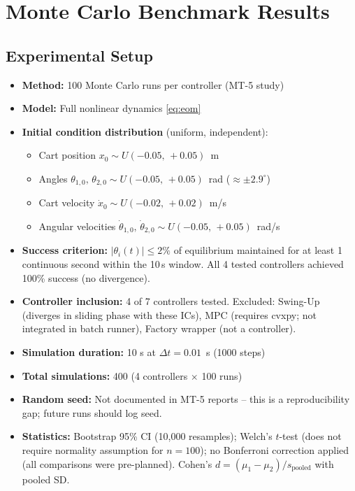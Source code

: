 \documentclass[11pt, a4paper]{article}
\begin{document}
\section{Monte Carlo Benchmark Results}
\label{sec:montecarlo}

\subsection{Experimental Setup}

\begin{itemize}[noitemsep]
  \item \textbf{Method:} 100 Monte Carlo runs per controller (MT-5 study)
  \item \textbf{Model:} Full nonlinear dynamics \eqref{eq:eom}
  \item \textbf{Initial condition distribution} (uniform, independent):
    \begin{itemize}[noitemsep]
      \item Cart position $x_0 \sim U(-0.05,\, +0.05)$~m
      \item Angles $\theta_{1,0},\, \theta_{2,0} \sim U(-0.05,\, +0.05)$~rad ($\approx\pm2.9^\circ$)
      \item Cart velocity $\dot{x}_0 \sim U(-0.02,\, +0.02)$~m/s
      \item Angular velocities $\dot{\theta}_{1,0},\, \dot{\theta}_{2,0} \sim U(-0.05,\, +0.05)$~rad/s
    \end{itemize}
  \item \textbf{Success criterion:} $|\theta_i(t)| \leq 2\%$ of equilibrium
        maintained for at least 1 continuous second within the 10\,s window.
        All 4 tested controllers achieved 100\% success (no divergence).
  \item \textbf{Controller inclusion:} 4 of 7 controllers tested.
        Excluded: Swing-Up (diverges in sliding phase with these ICs),
        MPC (requires cvxpy; not integrated in batch runner),
        Factory wrapper (not a controller).
  \item \textbf{Simulation duration:} 10 s at $\Delta t = 0.01$~s (1000 steps)
  \item \textbf{Total simulations:} 400 (4 controllers $\times$ 100 runs)
  \item \textbf{Random seed:} Not documented in MT-5 reports --
        this is a reproducibility gap; future runs should log seed.
  \item \textbf{Statistics:} Bootstrap 95\% CI (10,000 resamples);
        Welch's $t$-test (does not require normality assumption for $n=100$);
        no Bonferroni correction applied (all comparisons were pre-planned).
        Cohen's $d = (\mu_1 - \mu_2)/s_\text{pooled}$ with pooled SD.
\end{itemize}
\end{document}
